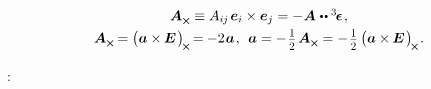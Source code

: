 \begin{otherlanguage}{russian}
\nopagebreak\vspace{-0.15em}\begin{equation}\label{pseudovectorinvariant}
\begin{array}{c}
\bm{A}_{\Xcompanion} \equiv A_{i\hspace{-0.1ex}j} \hspace{.25ex} \bm{e}_i \times \bm{e}_j = - \hspace{.1ex} \bm{A} \hspace{.1ex} \dotdotp \levicivitatensor
\hspace{.2ex}, \\[.3em]
%
\bm{A}_{\Xcompanion} \hspace{-0.16ex} = \left(^{\mathstrut} \hspace{-0.1ex} \bm{a} \times\hspace{-0.1ex} \UnitDyad \hspace{.2ex} \right)_{\hspace{-0.25ex}\Xcompanion} \hspace{-0.25ex} = \hspace{-0.12ex}
- 2 \hspace{.16ex} \bm{a} \hspace{.2ex},\:\:
\bm{a} = - \hspace{.2ex} \smalldisplaystyleonehalf \hspace{.25ex} \bm{A}_{\Xcompanion} = - \hspace{.2ex} \smalldisplaystyleonehalf \left(^{\mathstrut} \hspace{-0.1ex} \bm{a} \times\hspace{-0.1ex} \UnitDyad \hspace{.2ex} \right)_{\hspace{-0.25ex}\Xcompanion} \hspace{-0.2ex}.
\end{array}
\end{equation}

:






\end{otherlanguage}
